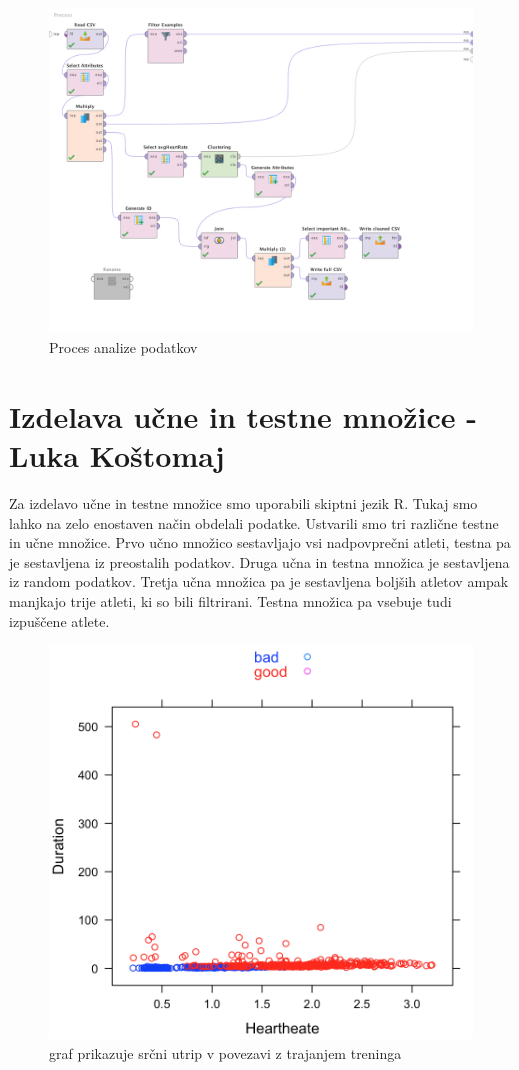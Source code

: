 \documentclass[a4paper,11pt]{article}
\begin{document}
\begin{figure}[H]
\caption{Proces analize podatkov}
\centering
\includegraphics[width=1\textwidth]{IntensityClusteringProcess}
\end{figure}


\newpage
\section{Izdelava učne in testne množice - Luka Koštomaj}
Za izdelavo učne in testne množice smo uporabili skiptni jezik R.
Tukaj smo lahko na zelo enostaven način obdelali podatke.
Ustvarili smo tri različne testne in učne množice.
Prvo učno množico sestavljajo vsi nadpovprečni atleti, testna pa je sestavljena iz preostalih podatkov.
Druga učna in testna množica je sestavljena iz random podatkov.
Tretja učna množica pa je sestavljena boljših atletov ampak manjkajo trije atleti, ki so bili filtrirani. 
Testna množica pa vsebuje tudi izpuščene atlete.

\begin{figure}[H]
\caption{graf prikazuje srčni utrip v povezavi z trajanjem treninga}
\centering
\includegraphics[width=1\textwidth]{athleteClassification}
\end{figure}
\end{document}
